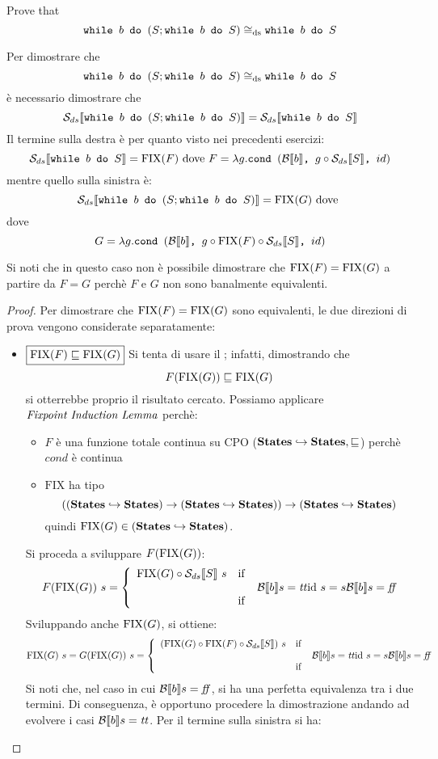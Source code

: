 {Prove that
$$
	 \wbS{b}{(S; \wbS{b}{S})} \eqDS \wbS{b}{S}
$$
}
{
Per dimostrare che 
$$
	 \wbS{b}{(S; \wbS{b}{S})} \eqDS \wbS{b}{S}
$$	
è necessario dimostrare che
$$
\dsCtxt{\wbS{b}{(S; \wbS{b}{S})}} = \dsCtxt{\wbS{b}{S}}
$$
Il termine sulla destra è per quanto visto nei precedenti esercizi:
$$
\dsCtxt{\wbS{b}{S}} =
\fixp{F} \text{ dove } F = \lambda g. \cond{b}{g \circ \dsCtxt{S}}{id}
$$
mentre quello sulla sinistra è:
$$
\dsCtxt{\wbS{b}{(S; \wbS{b}{S}})} = \fixp{G} \text{ dove }
$$
dove
$$
G = \lambda g. \cond{b}{g \circ \fixp{F} \circ \dsCtxt{S}}{id}
$$

Si noti che in questo caso non è possibile dimostrare che $\fixp{F} = \fixp{G}$
a partire da $F = G$ perchè $F$ e $G$ non sono banalmente equivalenti.

\begin{proof}
Per dimostrare che $\fixp{F} = \fixp{G}$ sono equivalenti, le due direzioni di
prova vengono considerate separatamente:
\begin{itemize}
	\item $\boxed{\fixp{F} \sqsubseteq \fixp{G}}$
	Si tenta di usare il \FPIL; infatti, dimostrando che
	$$
	F(\fixp{G}) \sqsubseteq \fixp{G}
	$$
	si otterrebbe proprio il risultato cercato.
  Possiamo applicare $\FPIL$ perchè:
  \begin{itemize}
   \item $F$ è una funzione totale continua su CPO 
($\states \hookrightarrow \states, \sqsubseteq$) perchè $cond$ è continua
  \item $\text{FIX}$ ha tipo
$$
((\states \hookrightarrow \states) \rightarrow 
(\states \hookrightarrow \states)) \rightarrow
(\states \hookrightarrow \states)
$$ 
quindi $\fixp{G} \in 
(\states \hookrightarrow \states)$.
  \end{itemize}
  Si proceda a sviluppare $F(\fixp{G})$:
  $$
  F(\fixp{G})\ s = \caseFun{\fixp{G} \circ \dsCtxt{S}\ s}
                        {\B{b} = \semtrue}
                        {\idDS\ s = s}
                        {\B{b} = \semfalse}
  $$
  Sviluppando anche $\fixp{G}$, si ottiene:
  $$
  \fixp{G}\ s =
  G(\fixp{G})\ s = \caseFun{(\fixp{G} \circ \fixp{F} \circ \dsCtxt{S})\ s}
                        {\B{b} = \semtrue}
                        {\idDS\ s = s}
                        {\B{b} = \semfalse}
  $$
  Si noti che, nel caso in cui $\B{b} = \semfalse$, si ha una perfetta
  equivalenza tra i due termini.
  Di conseguenza, è opportuno procedere la dimostrazione andando ad evolvere i
  casi $\B{b} = \semtrue$. Per il termine sulla sinistra si ha:

\end{itemize}
\end{proof}}
